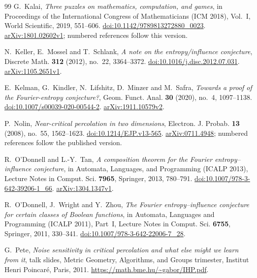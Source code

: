 \documentclass[11pt]{amsart}
\theoremstyle{remark}
\begin{document}
\begin{thebibliography}{99}
G.~Kalai,
\emph{Three puzzles on mathematics, computation, and games},
in Proceedings of the International Congress of Mathematicians (ICM 2018), Vol.~I,
World Scientific, 2019, 551--606.
\href{https://doi.org/10.1142/9789813272880_0023}{doi:10.1142/9789813272880\_0023}.
\href{https://arxiv.org/abs/1801.02602v1}{arXiv:1801.02602v1}; numbered references follow this version.

N.~Keller, E.~Mossel and T.~Schlank,
\emph{A note on the entropy/influence conjecture},
Discrete Math. \textbf{312} (2012), no.~22, 3364--3372.
\href{https://doi.org/10.1016/j.disc.2012.07.031}{doi:10.1016/j.disc.2012.07.031}.
\href{https://arxiv.org/abs/1105.2651v1}{arXiv:1105.2651v1}.

E.~Kelman, G.~Kindler, N.~Lifshitz, D.~Minzer and M.~Safra,
\emph{Towards a proof of the Fourier-entropy conjecture?},
Geom. Funct. Anal. \textbf{30} (2020), no.~4, 1097--1138.
\href{https://doi.org/10.1007/s00039-020-00544-2}{doi:10.1007/s00039-020-00544-2}.
\href{https://arxiv.org/abs/1911.10579v2}{arXiv:1911.10579v2}.

P.~Nolin,
\emph{Near-critical percolation in two dimensions},
Electron. J. Probab. \textbf{13} (2008), no.~55, 1562--1623.
\href{https://doi.org/10.1214/EJP.v13-565}{doi:10.1214/EJP.v13-565}.
\href{https://arxiv.org/abs/0711.4948}{arXiv:0711.4948}; numbered references follow the published version.

R.~O'Donnell and L.-Y.~Tan,
\emph{A composition theorem for the Fourier entropy--influence conjecture},
in Automata, Languages, and Programming (ICALP 2013),
Lecture Notes in Comput. Sci. \textbf{7965}, Springer, 2013, 780--791.
\href{https://doi.org/10.1007/978-3-642-39206-1_66}{doi:10.1007/978-3-642-39206-1\_66}.
\href{https://arxiv.org/abs/1304.1347v1}{arXiv:1304.1347v1}.

R.~O'Donnell, J.~Wright and Y.~Zhou,
\emph{The Fourier entropy--influence conjecture for certain classes of Boolean functions},
in Automata, Languages and Programming (ICALP 2011), Part~I,
Lecture Notes in Comput. Sci. \textbf{6755}, Springer, 2011, 330--341.
\href{https://doi.org/10.1007/978-3-642-22006-7_28}{doi:10.1007/978-3-642-22006-7\_28}.

G.~Pete,
\emph{Noise sensitivity in critical percolation and what else might we learn from it},
talk slides, Metric Geometry, Algorithms, and Groups trimester,
Institut Henri Poincar\'e, Paris, 2011.
\url{https://math.bme.hu/~gabor/IHP.pdf}.


\end{thebibliography}
\end{document}
